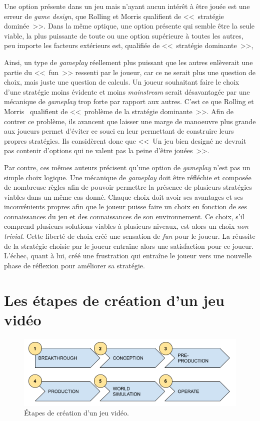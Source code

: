 Une option présente dans un jeu mais n'ayant aucun intérêt \`a être jouée est une erreur de \emph{game design}, que Rolling et Morris qualifient de <<~stratégie dominée~>>. 
Dans la même optique, une option présente qui semble être la seule viable, la plus puissante de toute ou une option supérieure à toutes les autres, peu importe les facteurs extérieurs est, qualifiée de <<~stratégie dominante~>>,

Ainsi, un type de \emph{gameplay} réellement plus puissant que les autres enlèverait une partie du <<~fun~>> ressenti par le joueur, car ce ne serait plus une question de choix, mais juste une question de calculs.
Un joueur souhaitant faire le choix d'une stratégie moins évidente et moins \emph{mainstream} serait désavantagée par une mécanique de \emph{gameplay} trop forte par rapport aux autres.
C'est ce que Rolling et Morris~\cite{Rollings2004} qualifient de <<~problème de la stratégie dominante~>>. 
Afin de contrer ce problème, ils avancent que laisser une marge de manoeuvre plus grande aux joueurs permet d'éviter ce souci en leur permettant de construire leurs propres stratégies.
Ils considèrent donc que <<~Un jeu bien designé ne devrait pas contenir d'options qui ne valent pas la peine d'être jouées~>>.

Par contre, ces m\^emes auteurs précisent qu'une option de \emph{gameplay} n'est pas un simple choix logique.
Une mécanique de \emph{gameplay} doit être réfléchie et composée de nombreuse règles afin de pouvoir permettre la présence de plusieurs stratégies viables dans un même cas donné.
%
Chaque choix doit avoir ses avantages et ses inconvénients propres afin que le joueur puisse faire un choix en fonction de ses connaissances du jeu et des connaissances de son environnement.
Ce choix, s'il comprend plusieurs solutions viables à plusieurs niveaux, est alors un choix \emph{non trivial}.
Cette liberté de choix créé une sensation de \emph{fun} pour le joueur.
%
La réussite de la stratégie choisie par le joueur entraîne alors une satisfaction pour ce joueur.
L'échec, quant à lui, créé une frustration qui entraîne le joueur vers une nouvelle phase de réflexion pour améliorer sa stratégie.


\section{Les étapes de création d'un jeu vid\'eo}
\label{prob.etapes}
\begin{figure}[H]
    \centering
    \includegraphics[width=14cm]{10_img/production_stages.png} 
    \caption{Étapes de création d'un jeu vidéo.}
    \label{fig.etapes}
\end{figure}

